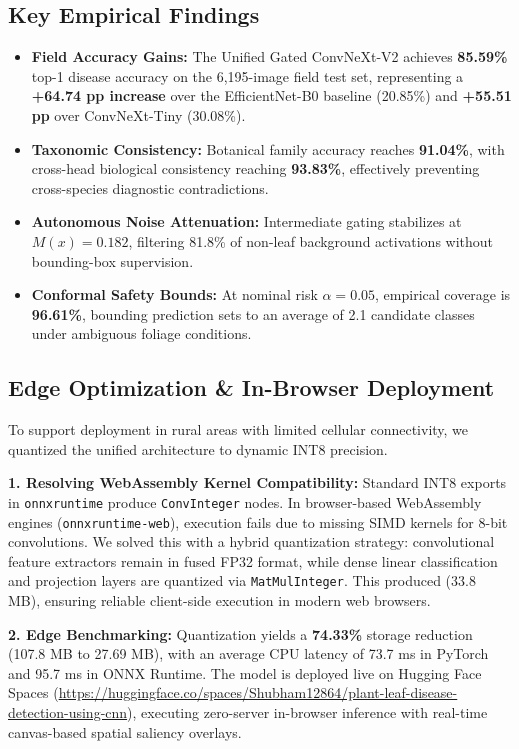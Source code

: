 \documentclass[conference]{IEEEtran}
\begin{document}
\subsection{Key Empirical Findings}
\begin{itemize}
    \item \textbf{Field Accuracy Gains:} The Unified Gated ConvNeXt-V2 achieves \textbf{85.59\%} top-1 disease accuracy on the 6,195-image field test set, representing a \textbf{+64.74 pp increase} over the EfficientNet-B0 baseline (20.85\%) and \textbf{+55.51 pp} over ConvNeXt-Tiny (30.08\%).
    \item \textbf{Taxonomic Consistency:} Botanical family accuracy reaches \textbf{91.04\%}, with cross-head biological consistency reaching \textbf{93.83\%}, effectively preventing cross-species diagnostic contradictions.
    \item \textbf{Autonomous Noise Attenuation:} Intermediate gating stabilizes at $M(x) = 0.182$, filtering 81.8\% of non-leaf background activations without bounding-box supervision.
    \item \textbf{Conformal Safety Bounds:} At nominal risk $\alpha=0.05$, empirical coverage is \textbf{96.61\%}, bounding prediction sets to an average of 2.1 candidate classes under ambiguous foliage conditions.
\end{itemize}

\subsection{Edge Optimization \& In-Browser Deployment}
To support deployment in rural areas with limited cellular connectivity, we quantized the unified architecture to dynamic INT8 precision.

\textbf{1. Resolving WebAssembly Kernel Compatibility:} Standard INT8 exports in \texttt{onnxruntime} produce \texttt{ConvInteger} nodes. In browser-based WebAssembly engines (\texttt{onnxruntime-web}), execution fails due to missing SIMD kernels for 8-bit convolutions. We solved this with a hybrid quantization strategy: convolutional feature extractors remain in fused FP32 format, while dense linear classification and projection layers are quantized via \texttt{MatMulInteger}. This produced  (33.8 MB), ensuring reliable client-side execution in modern web browsers.

\textbf{2. Edge Benchmarking:} Quantization yields a \textbf{74.33\%} storage reduction (107.8 MB to 27.69 MB), with an average CPU latency of 73.7 ms in PyTorch and 95.7 ms in ONNX Runtime. The model is deployed live on Hugging Face Spaces (\url{https://huggingface.co/spaces/Shubham12864/plant-leaf-disease-detection-using-cnn}), executing zero-server in-browser inference with real-time canvas-based spatial saliency overlays.
\end{document}
